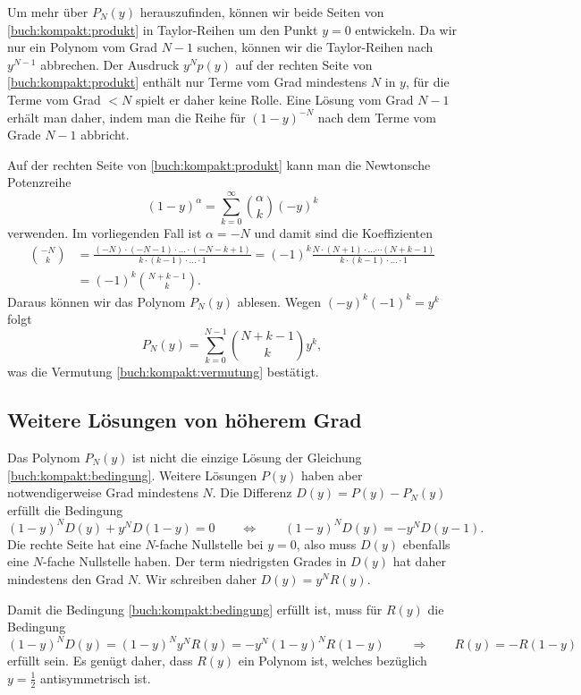Um mehr über $P_N(y)$ herauszufinden, können wir beide Seiten von
\eqref{buch:kompakt:produkt} in Taylor-Reihen um den Punkt $y=0$
entwickeln.
Da wir nur ein Polynom vom Grad $N-1$ suchen, können wir die Taylor-Reihen
nach $y^{N-1}$ abbrechen.
Der Ausdruck $y^Np(y)$ auf der rechten Seite von \eqref{buch:kompakt:produkt}
enthält nur Terme vom Grad mindestens $N$ in $y$,
für die Terme vom Grad $<N$ spielt er daher keine Rolle.
Eine Lösung vom Grad $N-1$ erhält man daher, indem man die Reihe
für $(1-y)^{-N}$ nach dem Terme vom Grade $N-1$ abbricht.

Auf der rechten Seite von \eqref{buch:kompakt:produkt}
kann man die Newtonsche Potenzreihe
\begin{equation*}
(1-y)^{\alpha} = \sum_{k=0}^{\infty} \binom{\alpha}{k} (-y)^k
\end{equation*}
verwenden.
Im vorliegenden Fall ist $\alpha=-N$ und damit sind die Koeffizienten
\begin{align*}
\binom{-N}{k}
&=
\frac{(-N)\cdot(-N-1)\cdot\dots\cdot (-N-k+1)}{k\cdot (k-1)\cdot\dots\cdot 1}
=
(-1)^k \frac{N\cdot(N+1)\cdot\dots\cdots (N+k-1)}{k\cdot(k-1)\cdot\dots\cdot 1}
\\
&=
(-1)^k \binom{N+k-1}{k}.
\end{align*}
Daraus können wir das Polynom $P_N(y)$ ablesen.
Wegen $(-y)^k(-1)^k=y^k$ folgt
\begin{equation}
P_N(y) = \sum_{k=0}^{N-1} \binom{N+k-1}{k}y^k,
\end{equation}
was die Vermutung \eqref{buch:kompakt:vermutung} bestätigt.

\subsection{Weitere Lösungen von höherem Grad}
Das Polynom $P_N(y)$ ist nicht die einzige Lösung der Gleichung
\eqref{buch:kompakt:bedingung}.
Weitere Lösungen $P(y)$ haben aber notwendigerweise Grad mindestens $N$.
Die Differenz $D(y) = P(y)-P_N(y)$ erfüllt die Bedingung
\[
(1-y)^N D(y) + y^N D(1-y) = 0
\qquad\Leftrightarrow\qquad
(1-y)^N D(y) = -y^N D(y-1).
\]
Die rechte Seite hat eine $N$-fache Nullstelle bei $y=0$, also muss
$D(y)$ ebenfalls eine $N$-fache Nullstelle haben. 
Der term niedrigsten Grades in $D(y)$ hat daher mindestens den Grad $N$.
Wir schreiben daher $D(y) = y^NR(y)$.

Damit die Bedingung \eqref{buch:kompakt:bedingung} erfüllt ist, muss
für $R(y)$ die Bedingung
\[
(1-y)^N
D(y)
=
(1-y)^N
y^N
R(y)
=
-y^N
(1-y)^N
R(1-y)
\qquad\Rightarrow\qquad
R(y) = -R(1-y)
\]
erfüllt sein.
Es genügt daher, dass $R(y)$ ein Polynom ist, welches bezüglich $y=\frac12$
antisymmetrisch ist.





